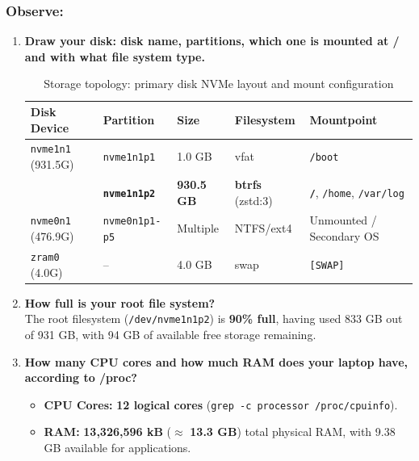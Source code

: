\documentclass{labreport}
\begin{document}
\subsubsection*{Observe:}
\begin{enumerate}[leftmargin=*]
    \item \textbf{Draw your disk: disk name, partitions, which one is mounted at / and with what file system type.}
    \begin{table}[H]
    \centering
    \small
    \begin{tabular}{lllll}
    \toprule
    \textbf{Disk Device} & \textbf{Partition} & \textbf{Size} & \textbf{Filesystem} & \textbf{Mountpoint} \\
    \midrule
    \texttt{nvme1n1} (931.5G) & \texttt{nvme1n1p1} & 1.0 GB & vfat & \texttt{/boot} \\
    & \textbf{\texttt{nvme1n1p2}} & \textbf{930.5 GB} & \textbf{btrfs} (zstd:3) & \textbf{\texttt{/}}, \texttt{/home}, \texttt{/var/log} \\
    \addlinespace
    \texttt{nvme0n1} (476.9G) & \texttt{nvme0n1p1-p5} & Multiple & NTFS/ext4 & Unmounted / Secondary OS \\
    \texttt{zram0} (4.0G) & -- & 4.0 GB & swap & \texttt{[SWAP]} \\
    \bottomrule
    \end{tabular}
    \caption{Storage topology: primary disk NVMe layout and mount configuration}
    \end{table}

    \item \textbf{How full is your root file system?}\\[0.2em]
    The root filesystem (\texttt{/dev/nvme1n1p2}) is \textbf{90\% full}, having used 833 GB out of 931 GB, with 94 GB of available free storage remaining.

    \item \textbf{How many CPU cores and how much RAM does your laptop have, according to /proc?}\\[0.2em]
    \begin{itemize}[noitemsep, topsep=2pt]
        \item \textbf{CPU Cores:} \textbf{12 logical cores} (\texttt{grep -c processor /proc/cpuinfo}).
        \item \textbf{RAM:} \textbf{13,326,596 kB} ($\approx$ \textbf{13.3 GB}) total physical RAM, with 9.38 GB available for applications.
    \end{itemize}


\end{enumerate}
\end{document}
